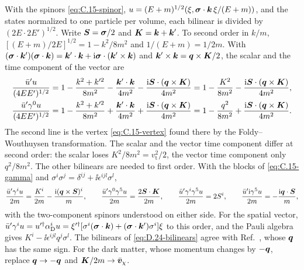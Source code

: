 With the spinors \cref{eq:C.15-spinor}, $u = (E + m)^{1/2}(\xi, \boldsymbol{\sigma}\cdot\bm{k}\,\xi/(E + m))$, and the states normalized to one particle per volume, each bilinear is divided by $(2E\cdot2E')^{1/2}$. Write $\bm{S} = \boldsymbol{\sigma}/2$ and $\bm{K} = \bm{k} + \bm{k}'$. To second order in $k/m$, $[(E + m)/2E]^{1/2} = 1 - k^2/8m^2$ and $1/(E + m) = 1/2m$. With $(\boldsymbol{\sigma}\cdot\bm{k}')(\boldsymbol{\sigma}\cdot\bm{k}) = \bm{k}'\cdot\bm{k} + \mathrm{i}\boldsymbol{\sigma}\cdot(\bm{k}'\times\bm{k})$ and $\bm{k}'\times\bm{k} = \bm{q}\times\bm{K}/2$, the scalar and the time component of the vector are
\begin{equation}
  \begin{aligned}
  \frac{\bar u'u}{(4EE')^{1/2}} &= 1 - \frac{k^2 + k'^2}{8m^2} - \frac{\bm{k}'\cdot\bm{k}}{4m^2} - \frac{\mathrm{i}\bm{S}\cdot(\bm{q}\times\bm{K})}{4m^2}
  = 1 - \frac{K^2}{8m^2} - \frac{\mathrm{i}\bm{S}\cdot(\bm{q}\times\bm{K})}{4m^2} , \\
  \frac{\bar u'\gamma^0u}{(4EE')^{1/2}} &= 1 - \frac{k^2 + k'^2}{8m^2} + \frac{\bm{k}'\cdot\bm{k}}{4m^2} + \frac{\mathrm{i}\bm{S}\cdot(\bm{q}\times\bm{K})}{4m^2}
  = 1 - \frac{q^2}{8m^2} + \frac{\mathrm{i}\bm{S}\cdot(\bm{q}\times\bm{K})}{4m^2} .
  \end{aligned}
  \label{eq:D.24-S-V0}
\end{equation}
The second line is the vertex \cref{eq:C.15-vertex} found there by the Foldy--Wouthuysen transformation. The scalar and the vector time component differ at second order: the scalar loses $K^2/8m^2 = v_{\mathrm{t}}^2/2$, the vector time component only $q^2/8m^2$. The other bilinears are needed to first order. With the blocks of \cref{eq:C.15-gamma} and $\sigma^i\sigma^j = \delta^{ij} + \ii\epsilon^{ijl}\sigma^l$,
\begin{equation}
  \frac{\bar u'\gamma^iu}{2m} = \frac{K^i}{2m} - \frac{\mathrm{i}(\bm{q}\times\bm{S})^i}{m}, \qquad
  \frac{\bar u'\gamma^0\gamma^5u}{2m} = \frac{2\bm{S}\cdot\bm{K}}{2m}, \qquad
  \frac{\bar u'\gamma^i\gamma^5u}{2m} = 2S^i, \qquad
  \frac{\bar u'\mathrm{i}\gamma^5u}{2m} = -\frac{\mathrm{i}\bm{q}\cdot\bm{S}}{m} ,
  \label{eq:D.24-bilinears}
\end{equation}
with the two-component spinors understood on either side. For the spatial vector, $\bar u'\gamma^iu = u'^\dagger\alpha_{\mathrm{D}}^iu = \xi'^\dagger[\sigma^i(\boldsymbol{\sigma}\cdot\bm{k}) + (\boldsymbol{\sigma}\cdot\bm{k}')\sigma^i]\xi$ to this order, and the Pauli algebra gives $K^i - \ii\epsilon^{ijl}q^j\sigma^l$. The bilinears of \cref{eq:D.24-bilinears} agree with Ref.~\cite[Table~I]{trickle2022effective}, whose $\bm{q}$ has the same sign. For the dark matter, whose momentum changes by $-\bm{q}$, replace $\bm{q} \to -\bm{q}$ and $\bm{K}/2m \to \bar{\bm{v}}_\chi$.

